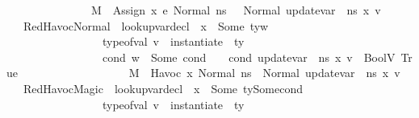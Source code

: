 \begin{isabellebody}
\ \ \ \ \ \ \ \ \ \ \ \ \ \ \ M{\isacharcomma}{\kern0pt}{\isasymLambda}{\isacharcomma}{\kern0pt}{\isasymGamma}{\isacharcomma}{\kern0pt}{\isasymOmega}\ {\isasymturnstile}\ {\isasymlangle}Assign\ x\ e{\isacharcomma}{\kern0pt}\ Normal\ n{\isacharunderscore}{\kern0pt}s{\isasymrangle}\ {\isasymrightarrow}\ \ Normal\ {\isacharparenleft}{\kern0pt}update{\isacharunderscore}{\kern0pt}var\ {\isasymLambda}\ n{\isacharunderscore}{\kern0pt}s\ x\ v{\isacharparenright}{\kern0pt}{\isachardoublequoteclose}\isanewline
\ \ {\isacharbar}{\kern0pt}\ RedHavocNormal{\isacharcolon}{\kern0pt}\ {\isachardoublequoteopen}{\isasymlbrakk}\ lookup{\isacharunderscore}{\kern0pt}var{\isacharunderscore}{\kern0pt}decl\ {\isasymLambda}\ x\ {\isacharequal}{\kern0pt}\ Some\ {\isacharparenleft}{\kern0pt}ty{\isacharcomma}{\kern0pt}w{\isacharparenright}{\kern0pt}{\isacharsemicolon}{\kern0pt}\ \isanewline
\ \ \ \ \ \ \ \ \ \ \ \ \ \ \ \ \ type{\isacharunderscore}{\kern0pt}of{\isacharunderscore}{\kern0pt}val\ v\ {\isacharequal}{\kern0pt}\ instantiate\ {\isasymOmega}\ ty{\isacharsemicolon}{\kern0pt}\isanewline
\ \ \ \ \ \ \ \ \ \ \ \ \ \ \ \ \ {\isasymAnd}cond{\isachardot}{\kern0pt}\ w\ {\isacharequal}{\kern0pt}\ Some\ cond\ {\isasymLongrightarrow}\ {\isasymLambda}{\isacharcomma}{\kern0pt}{\isasymGamma}{\isacharcomma}{\kern0pt}{\isasymOmega}\ {\isasymturnstile}\ {\isasymlangle}cond{\isacharcomma}{\kern0pt}\ {\isacharparenleft}{\kern0pt}update{\isacharunderscore}{\kern0pt}var\ {\isasymLambda}\ n{\isacharunderscore}{\kern0pt}s\ x\ v{\isacharparenright}{\kern0pt}{\isasymrangle}\ {\isasymDown}\ BoolV\ True\ {\isasymrbrakk}\ {\isasymLongrightarrow}\isanewline
\ \ \ \ \ \ \ \ \ \ \ \ \ \ \ \ \ M{\isacharcomma}{\kern0pt}{\isasymLambda}{\isacharcomma}{\kern0pt}{\isasymGamma}{\isacharcomma}{\kern0pt}{\isasymOmega}\ {\isasymturnstile}\ {\isasymlangle}Havoc\ x{\isacharcomma}{\kern0pt}\ Normal\ n{\isacharunderscore}{\kern0pt}s{\isasymrangle}\ {\isasymrightarrow}\ Normal\ {\isacharparenleft}{\kern0pt}update{\isacharunderscore}{\kern0pt}var\ {\isasymLambda}\ n{\isacharunderscore}{\kern0pt}s\ x\ v{\isacharparenright}{\kern0pt}{\isachardoublequoteclose}\isanewline
\ \ {\isacharbar}{\kern0pt}\ RedHavocMagic{\isacharcolon}{\kern0pt}\ {\isachardoublequoteopen}{\isasymlbrakk}\ lookup{\isacharunderscore}{\kern0pt}var{\isacharunderscore}{\kern0pt}decl\ {\isasymLambda}\ x\ {\isacharequal}{\kern0pt}\ Some\ {\isacharparenleft}{\kern0pt}ty{\isacharcomma}{\kern0pt}Some{\isacharparenleft}{\kern0pt}cond{\isacharparenright}{\kern0pt}{\isacharparenright}{\kern0pt}{\isacharsemicolon}{\kern0pt}\ \isanewline
\ \ \ \ \ \ \ \ \ \ \ \ \ \ \ \ \ type{\isacharunderscore}{\kern0pt}of{\isacharunderscore}{\kern0pt}val\ v\ {\isacharequal}{\kern0pt}\ instantiate\ {\isasymOmega}\ ty{\isacharsemicolon}{\kern0pt}\isanewline

\end{isabellebody}
